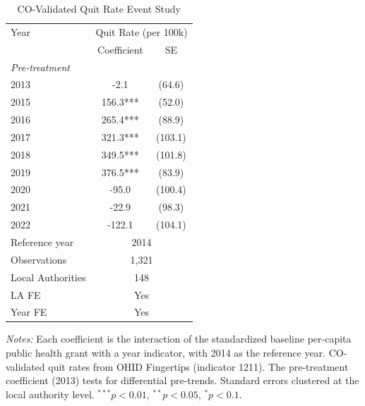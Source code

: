 \begin{table}[t]
\centering
\caption{CO-Validated Quit Rate Event Study}
\label{tab:quit_es}
\begin{tabular}{lcc}
\hline\hline
Year & \multicolumn{2}{c}{Quit Rate (per 100k)} \\
 & Coefficient & SE \\
\hline
\multicolumn{3}{l}{\textit{Pre-treatment}} \\
2013 & -2.1 & (64.6) \\
2015 & 156.3*** & (52.0) \\
2016 & 265.4*** & (88.9) \\
2017 & 321.3*** & (103.1) \\
2018 & 349.5*** & (101.8) \\
2019 & 376.5*** & (83.9) \\
2020 & -95.0 & (100.4) \\
2021 & -22.9 & (98.3) \\
2022 & -122.1 & (104.1) \\
\hline
Reference year & \multicolumn{2}{c}{2014} \\
Observations & \multicolumn{2}{c}{1,321} \\
Local Authorities & \multicolumn{2}{c}{148} \\
LA FE & \multicolumn{2}{c}{Yes} \\
Year FE & \multicolumn{2}{c}{Yes} \\
\hline\hline
\end{tabular}
\begin{tablenotes}
\item \textit{Notes:} Each coefficient is the interaction of the standardized baseline per-capita public health grant with a year indicator, with 2014 as the reference year. CO-validated quit rates from OHID Fingertips (indicator 1211). The pre-treatment coefficient (2013) tests for differential pre-trends. Standard errors clustered at the local authority level. $^{***}p<0.01$, $^{**}p<0.05$, $^{*}p<0.1$.
\end{tablenotes}
\end{table}

